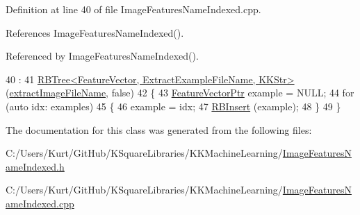 Definition at line 40 of file Image\+Features\+Name\+Indexed.\+cpp.



References Image\+Features\+Name\+Indexed().



Referenced by Image\+Features\+Name\+Indexed().


\begin{DoxyCode}
40                                                                                      :
41    \hyperlink{class_k_k_b_1_1_r_b_tree}{RBTree<FeatureVector, ExtractExampleFileName, KKStr>}
       (\hyperlink{_image_features_name_indexed_8cpp_a8b1897327db18e482626d842406ee791}{extractImageFileName}, \textcolor{keyword}{false})
42 \{
43   \hyperlink{class_k_k_m_l_l_1_1_feature_vector}{FeatureVectorPtr}  example = NULL;
44   \textcolor{keywordflow}{for}  (\textcolor{keyword}{auto} idx:  examples)
45   \{
46     example = idx;
47     \hyperlink{class_k_k_b_1_1_r_b_tree_a210190ae61de6e1a7b15b39673e6a47d}{RBInsert} (example);
48   \}
49 \}
\end{DoxyCode}


The documentation for this class was generated from the following files\+:\begin{DoxyCompactItemize}
\item 
C\+:/\+Users/\+Kurt/\+Git\+Hub/\+K\+Square\+Libraries/\+K\+K\+Machine\+Learning/\hyperlink{_image_features_name_indexed_8h}{Image\+Features\+Name\+Indexed.\+h}\item 
C\+:/\+Users/\+Kurt/\+Git\+Hub/\+K\+Square\+Libraries/\+K\+K\+Machine\+Learning/\hyperlink{_image_features_name_indexed_8cpp}{Image\+Features\+Name\+Indexed.\+cpp}\end{DoxyCompactItemize}
